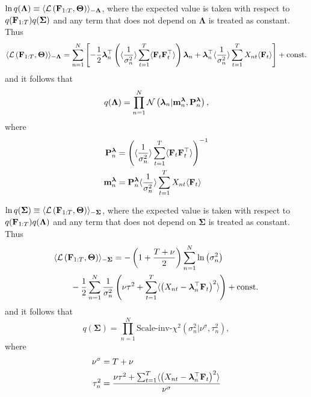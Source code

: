 $\ln q({\bm \Lambda}) \equiv \langle \mathcal{L} \left( {\bf F}_{1:T}, {\bm \Theta} \right) \rangle_{-\bm \Lambda}$, where the expected value is taken with respect to $q({\bf F}_{1:T}) q(\bm \Sigma)$ and any term that does not depend on $\bm \Lambda$ is treated as constant. Thus
\begin{equation}
	\langle \mathcal{L} \left( {\bf F}_{1:T}, {\bm \Theta} \right) \rangle_{-\bm \Lambda} = \sum_{n = 1}^N \left[ -\frac{1}{2} {\bm \lambda}_n^{\top} \left( \langle \frac{1}{\sigma_n^2} \rangle \sum_{t = 1}^T \langle {\bf F}_t {\bf F}_t^{\top} \rangle \right) {\bm \lambda}_n + {\bm \lambda}_n^{\top} \langle \frac{1}{\sigma_n^2} \rangle \sum_{t = 1}^T X_{nt} \langle {\bf F}_t \rangle \right] + \text{const.}
\end{equation}
and it follows that 
\begin{equation}
	q(\bm \Lambda) = \prod_{n = 1}^N \mathcal{N} \left( {\bm \lambda}_n | {\bf m}_n^{\bm \lambda}, {\bf P}_n^{\bm \lambda} \right),
\end{equation}
where
\begin{align}
	{\bf P}_n^{\bm \lambda} &= \left( \langle \frac{1}{\sigma_n^2} \rangle \sum_{t = 1}^T \langle {\bf F}_t {\bf F}_t^{\top} \rangle \right)^{-1} \\
	{\bf m}_n^{\bm \lambda} &= {\bf P}_n^{\bm \lambda} \langle \frac{1}{\sigma_n^2} \rangle \sum_{t = 1}^T X_{nt} \langle {\bf F}_t \rangle
\end{align}

$\ln q({\bm \Sigma}) \equiv \langle \mathcal{L} \left( {\bf F}_{1:T}, {\bm \Theta} \right) \rangle_{-\bm \Sigma}$, where the expected value is taken with respect to $q({\bf F}_{1:T}) q(\bm \Lambda)$ and any term that does not depend on $\bm \Sigma$ is treated as constant. Thus
\begin{equation}
	\begin{split}
		\MoveEqLeft
		\langle \mathcal{L} \left( {\bf F}_{1:T}, {\bm \Theta} \right) \rangle_{-\bm \Sigma} = - \left( 1 + \frac{T + \nu}{2} \right) \sum_{n = 1}^N \ln \left( \sigma_n^2 \right) \\ 
		&- \frac{1}{2} \sum_{n = 1}^N \frac{1}{\sigma_n^2} \left( \nu \tau^2 + \sum_{t = 1}^T \langle \left( X_{nt} - {\bm \lambda}_n^{\top} {\bf F}_t \right)^2 \rangle \right) + \text{const.}
	\end{split}
\end{equation}
and it follows that 
\begin{equation}
	q({\bm \Sigma}) = \prod_{n = 1}^N \text{Scale-inv-}\chi^2 \left( \sigma_n^2 | \nu^{\sigma}, \tau_n^2 \right),
\end{equation}
where
\begin{align}
	\nu^{\sigma} &= T + \nu \\
	\tau_n^2 &= \frac{\nu \tau^2 + \sum_{t = 1}^T \langle \left( X_{nt} - {\bm \lambda}_n^{\top} {\bf F}_t \right)^2 \rangle}{\nu^{\sigma}} 
\end{align}

